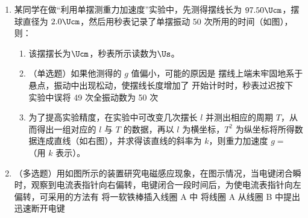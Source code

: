 \documentclass[\gkver]{gaokaozhenti}
\begin{document}
\begin{enumerate}
\item
某同学在做“利用单摆测重力加速度”实验中，先测得摆线长为 $97.50\Ucm$，摆球直径为 $2.0\Ucm$，然后用秒表记录了单摆振动 50 次所用的时间（如图），则：
\begin{enumerate}
	\item
	该摆摆长为$\Ucm$，秒表所示读数为$\Us$。
	\item
	（单选题）如果他测得的 $g$ 值偏小，可能的原因是
	{摆线上端未牢固地系于悬点，振动中出现松动，使摆线长度增加了}
	{开始计时时，秒表过迟按下}
	{实验中误将 49 次全振动数为 50 次}
	\item
	为了提高实验精度，在实验中可改变几次摆长 $l$ 并测出相应的周期 $T$，从而得出一组对应的 $l$ 与 $T$ 的数据，再以 $l$ 为横坐标，$T^{2}$ 为纵坐标将所得数据连成直线（如右图），并求得该直线的斜率为 $k$，则重力加速度 $g =$ （用 $k$ 表示）。
\end{enumerate}
\twopicture[labelA=1996上海23a, labelB=1996上海23b, w=6cm, align=right]
{}
{}

\item
（多选题）用如图所示的装置研究电磁感应现象，在图示情况，当电键闭合瞬时，观察到电流表指针向右偏转，电键闭合一段时间后，为使电流表指针向左偏转，可采用的方法有
\onepicture[w=7.5cm, align=right]{}
{将一软铁棒插入线圈 A 中}
{将线圈 A 从线圈 B 中提出}
{迅速断开电键}


\end{enumerate}
\end{document}
